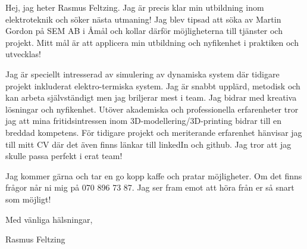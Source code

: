 \documentclass{article}
\begin{document}
Hej, jag heter Rasmus Feltzing. Jag är precis klar min utbildning inom elektroteknik och söker nästa utmaning! Jag blev tipsad att söka av Martin Gordon på SEM AB i Åmål och kollar därför möjligheterna till tjänster och projekt. Mitt mål är att applicera min utbildning och nyfikenhet i praktiken och utvecklas! 


Jag är speciellt intresserad av simulering av dynamiska system där tidigare projekt inkluderat elektro-termiska system. Jag är snabbt upplärd, metodisk och kan arbeta självständigt men jag briljerar mest i team. Jag bidrar med kreativa lösningar och nyfikenhet. Utöver akademiska och professionella erfarenheter tror jag att mina fritidsintressen inom 3D-modellering/3D-printing bidrar till en breddad kompetens. För tidigare projekt och meriterande erfarenhet hänvisar jag till mitt CV där det även finns länkar till linkedIn och github. Jag tror att jag skulle passa perfekt i erat team!


Jag kommer gärna och tar en go kopp kaffe och pratar möjligheter. Om det finns frågor når ni mig på 070 896 73 87. Jag ser fram emot att höra från er så snart som möjligt! 

\bigskip %

Med vänliga hälsningar,

\vspace{50pt} %

Rasmus Feltzing
\end{document}
